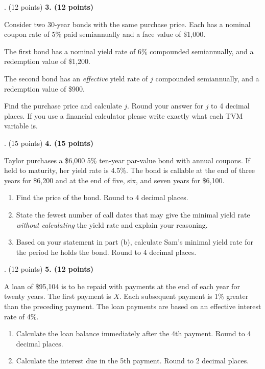 \documentclass[12pt]{article}
\makeatletter
\newenvironment{problem}[1][]{%
  \bigskip%
  \noindent\begin{boxedminipage}{\columnwidth}%
  \def\@tempa{#1}%
  \ifx\@tempa\empty\else%
    \textbf{#1}\hspace{0.5em}%
  \fi%
}{%
  \end{boxedminipage}%
}
\makeatother
\begin{document}
\begin{problem}[3. (12 points)]
Consider two 30-year bonds with the same purchase price. Each has a
nominal coupon rate of 5\% paid semiannually and a face value of \$1{,}000.

\medskip

The first bond has a nominal yield rate of 6\% compounded semiannually, and a
redemption value of \$1{,}200.

\medskip

The second bond has an \textit{effective} yield rate of $j$ compounded semiannually, and a
redemption value of \$900.

\medskip

Find the purchase price and calculate $j$. Round your answer for $j$ to 4 decimal places. If you use a financial calculator please write exactly what each TVM variable is.
\end{problem}


\newpage

\begin{problem}[4. (15 points)]
Taylor purchases a \$6{,}000 5\% ten-year par-value bond with annual coupons. If held to
maturity, her yield rate is 4.5\%. The bond is callable at the end of three years for \$6{,}200
and at the end of five, six, and seven years for \$6{,}100.

\begin{enumerate}
    \item[(a)] Find the price of the bond. Round to 4 decimal places. 
    \item[(b)] State the fewest number of call dates that may give the minimal yield rate \textit{without
    calculating} the yield rate and explain your reasoning.
    \item[(c)] Based on your statement in part (b), calculate Sam’s minimal yield
    rate for the period he holds the bond. Round to 4 decimal places.
\end{enumerate}
\end{problem}


\newpage


\begin{problem}[5. (12 points)]
A loan of \$95{,}104 is to be repaid with payments at the end of each year for twenty
years. The first payment is $X$. Each subsequent payment is 1\% greater than the
preceding payment. The loan payments are based on an effective interest rate of 4\%.

\begin{enumerate}
    \item[(a)] Calculate the loan balance immediately after the 4th payment. Round
    to 4 decimal places.
    \item[(b)] Calculate the interest due in the 5th payment. Round to 2 decimal
    places.
\end{enumerate}
\end{problem}
\end{document}
